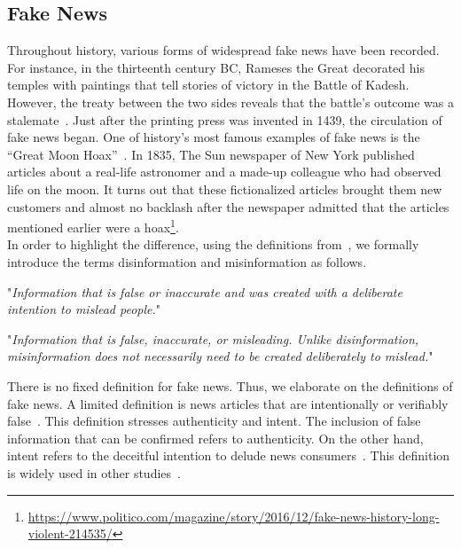 \subsection{Fake News}
\label{subsec:fakeNewsDetection_fakeNews}
Throughout history, various forms of widespread fake news have been recorded. For instance, in the thirteenth
century BC, Rameses the Great decorated his temples with paintings that tell stories of victory in the Battle
of Kadesh. However, the treaty between the two sides reveals that the battle's outcome was a
stalemate~\parencite{HistorysGreatestLies_Weir}. Just after the printing press was invented in 1439, the
circulation of fake news began. One of history's most famous examples of fake news is the
“Great Moon Hoax”~\parencite{TheGreatMoonHoax_Foster}. In 1835, The Sun newspaper of New York published articles about a real-life astronomer and a made-up colleague who had observed life on the moon. It turns out that these fictionalized articles brought them new customers and almost no backlash after the newspaper admitted that the articles mentioned earlier were a hoax\footnote{\url{https://www.politico.com/magazine/story/2016/12/fake-news-history-long-violent-214535/}}.\\
In order to highlight the difference, using the definitions from~\parencite{ThePsycologyOfFakeNews_Pennycook}, we formally introduce the terms disinformation and misinformation as follows.
\begin{definition}
    "\emph{Information that is false or inaccurate and was created with a deliberate intention to mislead people.}"~\parencite{ThePsycologyOfFakeNews_Pennycook}
\end{definition}
\begin{definition}
    "\emph{Information that is false, inaccurate, or misleading. Unlike disinformation, misinformation does not necessarily need to be created deliberately to mislead.}"~\parencite{ThePsycologyOfFakeNews_Pennycook}
\end{definition}
There is no fixed definition for fake news. Thus, we elaborate on the definitions of fake news. A limited definition is news articles that are intentionally or verifiably false~\parencite{SocialMediaAndFakeNewsIn2016Election_Allcott}. This definition stresses authenticity and intent. The inclusion of false information that can be confirmed refers to authenticity. On the other hand, intent refers to the deceitful intention to delude news consumers~\parencite{FakeNewsDetectionOnSocialMediaADataMiningPerspective_Shu}. This definition is widely used in other studies~\parencite{AutomaticDeceptionDetection_Conroy, TheFakeNewsSpreadingPlague_Mustafaraj, FakeNewsDetectionOnSocialMediaADataMiningPerspective_Shu}.\\
